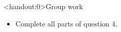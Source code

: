\documentclass[xcolor=table, aspectratio=169, bigger, handout]{beamer}
\begin{document}
\begin{frame}<handout:0>{Group work}
\begin{block}{}
\begin{itemize}
\item Complete all parts of question 4.
\end{itemize}
\end{block}
\end{frame}
\end{document}
